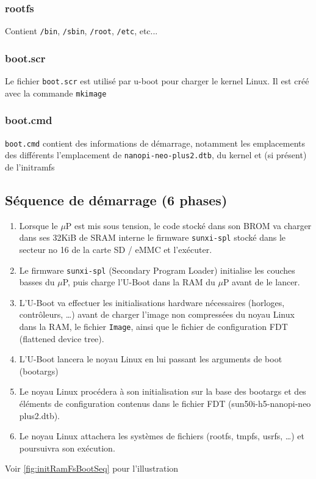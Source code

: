 \documentclass[resume]{subfiles}
\begin{document}
\subsubsection{rootfs}
Contient \verb!/bin!, \verb!/sbin!, \verb!/root!, \verb!/etc!, etc...
\subsubsection{boot.scr}
Le fichier \verb!boot.scr! est utilisé par u-boot pour charger le kernel Linux. Il est créé avec la commande \verb!mkimage!
\subsubsection{boot.cmd}
\verb!boot.cmd! contient des informations de démarrage, notamment les emplacements des différents l'emplacement de \verb!nanopi-neo-plus2.dtb!, du kernel et (si présent) de l'initramfs

\subsection{Séquence de démarrage (6 phases)}
\begin{enumerate}
\item Lorsque le $\mu$P est mis sous tension, le code stocké dans son BROM va charger dans ses 32KiB de SRAM interne le firmware \verb!sunxi-spl! stocké dans le secteur no 16 de la carte SD / eMMC et l’exécuter. 
\item Le firmware \verb!sunxi-spl! (Secondary Program Loader) initialise les couches basses du $\mu$P, puis charge l'U-Boot dans la RAM du $\mu$P avant de le lancer.
\item L'U-Boot va effectuer les initialisations hardware nécessaires (horloges, contrôleurs, …) avant de charger l’image non compressées du noyau Linux dans la RAM, le fichier \verb!Image!, ainsi que le fichier de configuration FDT (flattened device tree).
\item L'U-Boot lancera le noyau Linux en lui passant les arguments de boot (bootargs)
\item Le noyau Linux procédera à son initialisation sur la base des bootargs et des éléments de configuration contenus dans le fichier FDT (sun50i-h5-nanopi-neo plus2.dtb).
\item Le noyau Linux attachera les systèmes de fichiers (rootfs, tmpfs, usrfs, …) et poursuivra son exécution.
\end{enumerate}
Voir \ref{fig:initRamFsBootSeq} pour l'illustration
\end{document}
